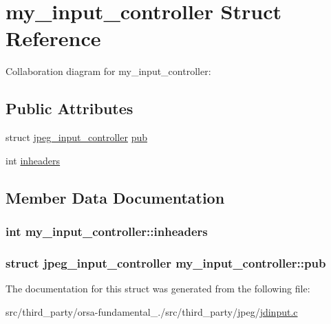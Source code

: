 \hypertarget{structmy__input__controller}{}\section{my\+\_\+input\+\_\+controller Struct Reference}
\label{structmy__input__controller}


Collaboration diagram for my\+\_\+input\+\_\+controller\+:
\subsection*{Public Attributes}
\begin{DoxyCompactItemize}
\item 
struct \hyperlink{structjpeg__input__controller}{jpeg\+\_\+input\+\_\+controller} \hyperlink{structmy__input__controller_a4ccad4a8586a7c91d0d71b45d0e78514}{pub}
\item 
int \hyperlink{structmy__input__controller_a722193efbf3a95d55c75c027be93fd31}{inheaders}
\end{DoxyCompactItemize}


\subsection{Member Data Documentation}
\hypertarget{structmy__input__controller_a722193efbf3a95d55c75c027be93fd31}{}
\subsubsection[{inheaders}]{\setlength{\rightskip}{0pt plus 5cm}int my\+\_\+input\+\_\+controller\+::inheaders}\label{structmy__input__controller_a722193efbf3a95d55c75c027be93fd31}
\hypertarget{structmy__input__controller_a4ccad4a8586a7c91d0d71b45d0e78514}{}
\subsubsection[{pub}]{\setlength{\rightskip}{0pt plus 5cm}struct {\bf jpeg\+\_\+input\+\_\+controller} my\+\_\+input\+\_\+controller\+::pub}\label{structmy__input__controller_a4ccad4a8586a7c91d0d71b45d0e78514}


The documentation for this struct was generated from the following file\+:\begin{DoxyCompactItemize}
\item 
src/third\+\_\+party/orsa-\/fundamental\+\_./src/third\+\_\+party/jpeg/\hyperlink{jdinput_8c}{jdinput.\+c}\end{DoxyCompactItemize}
